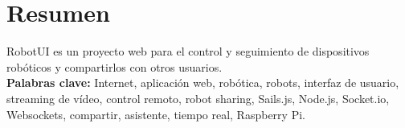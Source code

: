 \section*{Resumen}
\label{resumen}

RobotUI es un proyecto web para el control y seguimiento de dispositivos robóticos y compartirlos con otros usuarios.\\


\textbf{Palabras clave:} Internet, aplicación web, robótica, robots, interfaz de usuario, streaming de vídeo, control remoto, robot sharing, Sails.js, Node.js, Socket.io, Websockets, compartir, 
asistente, tiempo real, Raspberry Pi.
